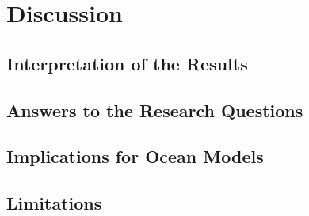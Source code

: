 
\chapter{Discussion}\label{chapter:discussion}

\section{Interpretation of the Results}

\section{Answers to the Research Questions}

\section{Implications for Ocean Models}

\section{Limitations}
